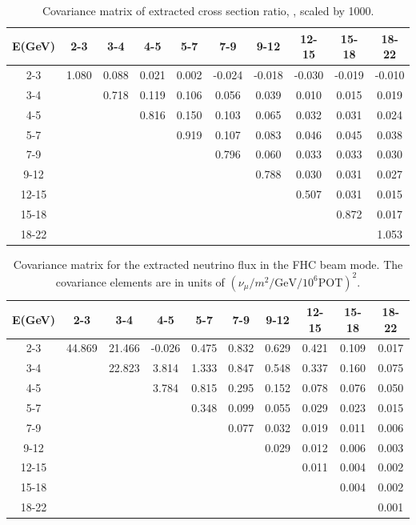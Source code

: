 \begin{table}[ht]
\begin{centering}
\begin{tabular}{|c|c c c c c c c c c|}
\hline
E(GeV)&2-3&3-4&4-5&5-7&7-9&9-12&12-15&15-18&18-22\\\hline
2-3&1.080&0.088&0.021&0.002&-0.024&-0.018&-0.030&-0.019&-0.010\\
3-4& &0.718&0.119&0.106&0.056&0.039&0.010&0.015&0.019\\
4-5& & &0.816&0.150&0.103&0.065&0.032&0.031&0.024\\
5-7& & & &0.919&0.107&0.083&0.046&0.045&0.038\\
7-9& & & & &0.796&0.060&0.033&0.033&0.030\\
9-12& & & & & &0.788&0.030&0.031&0.027\\
12-15& & & & & & &0.507&0.031&0.015\\
15-18& & & & & & & &0.872&0.017\\
18-22& & & & & & & & &1.053\\
\hline
\end{tabular}
\caption{Covariance matrix of extracted cross section ratio, \ratio{}, scaled by 1000. }
\label{app:r_cov}
\end{centering}
\end{table}


\begin{table}[ht]
\begin{centering}
\begin{tabular}{|c|c c c c c c c c c|}
\hline
E(GeV)&2-3&3-4&4-5&5-7&7-9&9-12&12-15&15-18&18-22\\\hline
2-3&44.869&21.466&-0.026&0.475&0.832&0.629&0.421&0.109&0.017\\
3-4& &22.823&3.814&1.333&0.847&0.548&0.337&0.160&0.075\\
4-5& & &3.784&0.815&0.295&0.152&0.078&0.076&0.050\\
5-7& & & &0.348&0.099&0.055&0.029&0.023&0.015\\
7-9& & & & &0.077&0.032&0.019&0.011&0.006\\
9-12& & & & & &0.029&0.012&0.006&0.003\\
12-15& & & & & & &0.011&0.004&0.002\\
15-18& & & & & & & &0.004&0.002\\
18-22& & & & & & & & &0.001\\
\hline
\end{tabular}
\caption{Covariance matrix for the extracted neutrino flux in the FHC beam mode. The covariance elements are in units of  $(\nu_{\mu}/m^{2}/\textrm{GeV}/10^{6} \textrm{POT})^{2}$.}
\end{centering}
\end{table}

